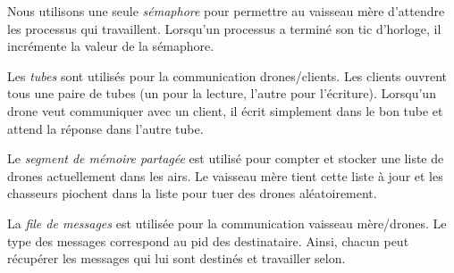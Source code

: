 Nous utilisons une seule \emph{sémaphore} pour permettre au vaisseau mère d'attendre les processus qui travaillent. Lorsqu'un
processus a terminé son tic d'horloge, il incrémente la valeur de la sémaphore.

Les \emph{tubes} sont utilisés pour la communication drones/clients.
Les clients ouvrent tous une paire de tubes (un pour la lecture, l'autre pour l'écriture).
Lorsqu'un drone veut communiquer avec un client, il écrit simplement dans le bon tube et attend la réponse dans l'autre tube.

Le \emph{segment de mémoire partagée} est utilisé pour compter et stocker une liste de drones actuellement dans les airs.
Le vaisseau mère tient cette liste à jour et les chasseurs piochent dans la liste pour tuer des drones aléatoirement.

La \emph{file de messages} est utilisée pour la communication vaisseau mère/drones. Le type des messages correspond au pid des
destinataire. Ainsi, chacun peut récupérer les messages qui lui sont destinés et travailler selon.

